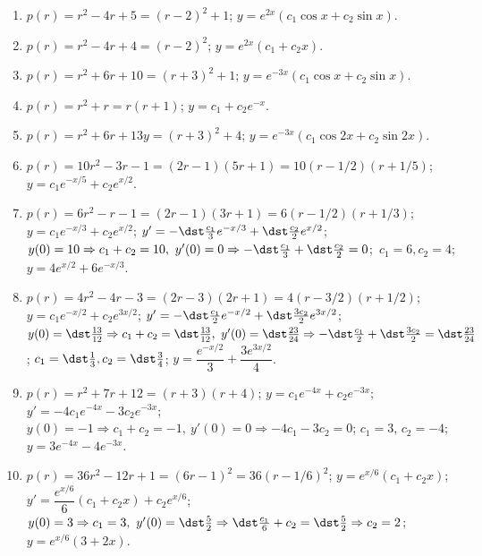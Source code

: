 \documentclass[openany]{book}
\newenvironment{sectionSolutions}{
 \begin{enumerate}[item-label={\thesection.\arabic{enumi}.}]
}{
 \end{enumerate}
}
\begin{document}
\begin{sectionSolutions}
\item
$p(r)=r^2-4r+5=(r-2)^2+1$;\;
$y=e^{2x}(c_1 \cos x+c_2 \sin x)$.

\item
$p(r)=r^2-4r+4=(r-2)^2$;\;
 $y=e^{2x}(c_1+c_2x)$.

\item
$p(r)=r^2+6r+10=(r+3)^2+1$;\;
$y=e^{-3x}(c_1 \cos x+c_2 \sin x)$.


\item
$p(r)=r^2+r=r(r+1)$;\;
 $y=c_1+c_2e^{-x}$.


\item
$p(r)=r^2+6r+13y=(r+3)^2+4$;\;
 $y=e^{-3x}(c_1\cos 2x+c_2\sin 2x)$.


\item
$p(r)=10r^2-3r-1=(2r-1)(5r+1)=10(r-1/2)
(r+1/5)$;\;
$y=c_1e^{-x/5}+c_2e^{x/2}$.


\item
$p(r)=6r^2-r-1=(2r-1)(3r+1)=6(r-1/2) (r+1/3)$;\;
$y=c_1e^{-x/3}+c_2e^{x/2}$;\;
$y'=-\dst\frac{c_1}{3}e^{-x/3}+\dst\frac{c_2}{2}e^{x/2}$;\;
 $y(0)=10\Rightarrow c_1+c_2=10,\ y'(0)=0\Rightarrow -\dst\frac{c_1}{3}
+\dst\frac{c_2}{2}=0$;\ $c_1=6, c_2=4$;\;
$y=4e^{x/2}+6e^{-x/3}$.



\item
$p(r)=4r^2-4r-3=(2r-3)(2r+1)= 4(r-3/2)(r+1/2)$;
$y=c_1e^{-x/2} +c_2e^{3x/2}$;\;
$y'=-\dst\frac{c_1}{2}e^{-x/2} +\dst\frac{3c_2}{2}e^{3x/2}$;\;
 $y(0)=\dst\frac{13}{ 12}\Rightarrow c_1+c_2=\dst\frac{13}{12},\
y'(0)=\dst\frac{23 }{ 24}\Rightarrow
-\dst\frac{c_1}{2}+\dst\frac{3c_2}{2}=\dst\frac{23}{24}$;\;
$c_1=\dst\frac{1}{3}, c_2=\dst\frac{3}{4}$;\;
$y=\dfrac{e^{-x/2}}{ 3}+\dfrac{3e^{3x/2}}{4}$.


\item
$p(r)=r^2+7r+12=(r+3)(r+4)$;\;
$y=c_1e^{-4x}+c_2e^{-3x}$;\;
$y'=-4c_1e^{-4x}-3c_2e^{-3x}$;\;
 $y(0)=-1\Rightarrow c_1+c_2=-1,\ y'(0)=0\Rightarrow -4c_1-3c_2=0$;\;
$c_1=3$, $c_2=-4$;\;
$y=3e^{-4x}-4e^{-3x}$.






\item
$p(r)=36r^2-12r+1=(6r-1)^2=36(r-1/6)^2$;\;
$y=e^{x/6}(c_1+c_2x)$;\;
$y'=\dfrac{e^{x/6}}{6}(c_1+c_2x)+c_2e^{x/6}$;\;
$y(0)=3\Rightarrow c_1=3,\ y'(0)=\dst\frac{5}{2}\Rightarrow
\dst\frac{c_1}{6}+c_2=\dst\frac{5}{2}\Rightarrow c_2=2$;\;
$y=e^{x/6}(3+2x)$.




\end{sectionSolutions}
\end{document}
